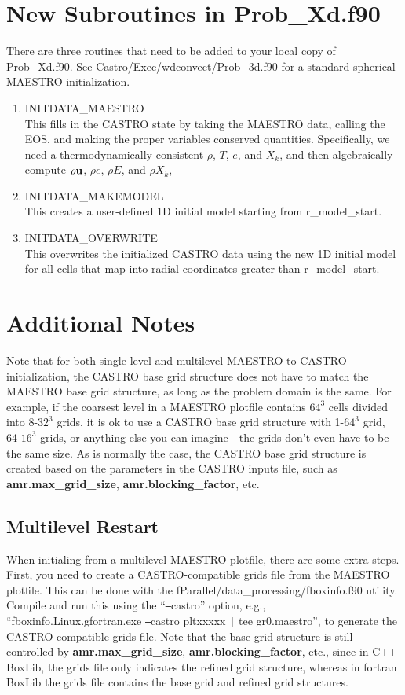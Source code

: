 \section{New Subroutines in Prob\_Xd.f90}
There are three routines that need to be added to your local copy of Prob\_Xd.f90.  See Castro/Exec/wdconvect/Prob\_3d.f90 for a standard spherical MAESTRO initialization.
\begin{enumerate}
\item INITDATA\_MAESTRO\\
This fills in the CASTRO state by taking the MAESTRO data, calling the EOS, and making the proper variables conserved quantities.  Specifically, we need a thermodynamically consistent $\rho$, $T$, $e$, and $X_k$, and then algebraically compute $\rho{\bf u}$, $\rho e$, $\rho E$, and $\rho X_k$,
\item INITDATA\_MAKEMODEL\\
This creates a user-defined 1D initial model starting from r\_model\_start.
\item INITDATA\_OVERWRITE\\
This overwrites the initialized CASTRO data using the new 1D initial model for all cells that map into radial coordinates greater than r\_model\_start.
\end{enumerate}

\section{Additional Notes}
Note that for both single-level and multilevel MAESTRO to CASTRO initialization, the CASTRO base grid structure does not have to match the MAESTRO base grid structure, as long as the problem domain is the same.  For example, if the coarsest level in a MAESTRO plotfile contains $64^3$ cells divided into 8-$32^3$ grids, it is ok to use a CASTRO base grid structure with 1-$64^3$ grid, 64-$16^3$ grids, or anything else you can imagine - the grids don't even have to be the same size.  As is normally the case, the CASTRO base grid structure is created based on the parameters in the CASTRO inputs file, such as {\bf amr.max\_grid\_size}, {\bf amr.blocking\_factor}, etc.

\subsection{Multilevel Restart}
When initialing from a multilevel MAESTRO plotfile, there are some extra steps.  First, you need to create a CASTRO-compatible grids file from the MAESTRO plotfile.  This can be done with the fParallel/data\_processing/fboxinfo.f90 utility.  Compile and run this using the ``\texttt{--}castro'' option, e.g., ``fboxinfo.Linux.gfortran.exe \texttt{--}castro pltxxxxx \texttt{|} tee gr0.maestro'', to generate the CASTRO-compatible grids file.  Note that the base grid structure is still controlled by {\bf amr.max\_grid\_size}, {\bf amr.blocking\_factor}, etc., since in C++ BoxLib, the grids file only indicates the refined grid structure, whereas in fortran BoxLib the grids file contains the base grid and refined grid structures.

